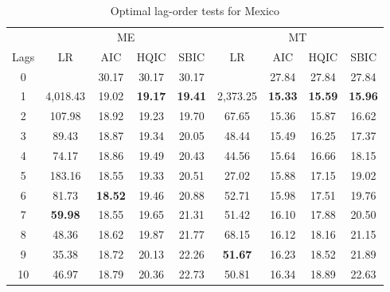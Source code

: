 \documentclass[a4paper, twoside]{templates/ociamthesis}
\begin{document}
\begin{table}[H]

\caption{\label{tab:TableC26}Optimal lag-order tests for Mexico}
\centering
\fontsize{10}{12}\selectfont
\begin{tabular}[t]{ccccccccc}
\toprule
\multicolumn{1}{c}{ } & \multicolumn{4}{c}{ME} & \multicolumn{4}{c}{MT} \\
\cmidrule(l{3pt}r{3pt}){2-5} \cmidrule(l{3pt}r{3pt}){6-9}
Lags & LR & AIC & HQIC & SBIC & LR & AIC & HQIC & SBIC\\
\midrule
0 &  & 30.17 & 30.17 & 30.17 &  & 27.84 & 27.84 & 27.84\\
1 & 4,018.43 & 19.02 & \textbf{19.17} & \textbf{19.41} & 2,373.25 & \textbf{15.33} & \textbf{15.59} & \textbf{15.96}\\
2 & 107.98 & 18.92 & 19.23 & 19.70 & 67.65 & 15.36 & 15.87 & 16.62\\
3 & 89.43 & 18.87 & 19.34 & 20.05 & 48.44 & 15.49 & 16.25 & 17.37\\
4 & 74.17 & 18.86 & 19.49 & 20.43 & 44.56 & 15.64 & 16.66 & 18.15\\
5 & 183.16 & 18.55 & 19.33 & 20.51 & 27.02 & 15.88 & 17.15 & 19.02\\
6 & 81.73 & \textbf{18.52} & 19.46 & 20.88 & 52.71 & 15.98 & 17.51 & 19.76\\
7 & \textbf{59.98} & 18.55 & 19.65 & 21.31 & 51.42 & 16.10 & 17.88 & 20.50\\
8 & 48.36 & 18.62 & 19.87 & 21.77 & 68.15 & 16.12 & 18.16 & 21.15\\
9 & 35.38 & 18.72 & 20.13 & 22.26 & \textbf{51.67} & 16.23 & 18.52 & 21.89\\
10 & 46.97 & 18.79 & 20.36 & 22.73 & 50.81 & 16.34 & 18.89 & 22.63\\
\bottomrule
\end{tabular}
\end{table}
\end{document}
